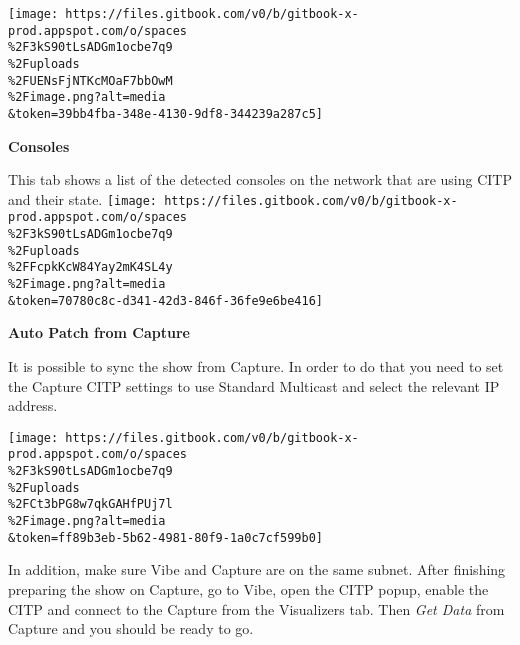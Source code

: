 \documentclass[
]{article}
\begin{document}
\texttt{[image: https://files.gitbook.com/v0/b/gitbook-x-prod.appspot.com/o/spaces\\\%2F3kS90tLsADGm1ocbe7q9\\\%2Fuploads\\\%2FUENsFjNTKcMOaF7bbOwM\\\%2Fimage.png?alt=media\\\&token=39bb4fba-348e-4130-9df8-344239a287c5]}

\textbf{Consoles}

This tab shows a list of the detected consoles on the network that are using CITP and their state.
\texttt{[image: https://files.gitbook.com/v0/b/gitbook-x-prod.appspot.com/o/spaces\\\%2F3kS90tLsADGm1ocbe7q9\\\%2Fuploads\\\%2FFcpkKcW84Yay2mK4SL4y\\\%2Fimage.png?alt=media\\\&token=70780c8c-d341-42d3-846f-36fe9e6be416]}

\textbf{Auto Patch from Capture}

It is possible to sync the show from Capture. In order to do that you need to set the Capture CITP settings to use Standard Multicast and select the relevant IP address.

\texttt{[image: https://files.gitbook.com/v0/b/gitbook-x-prod.appspot.com/o/spaces\\\%2F3kS90tLsADGm1ocbe7q9\\\%2Fuploads\\\%2FCt3bPG8w7qkGAHfPUj7l\\\%2Fimage.png?alt=media\\\&token=ff89b3eb-5b62-4981-80f9-1a0c7cf599b0]}

In addition, make sure Vibe and Capture are on the same subnet. After finishing preparing the show on Capture, go to Vibe, open the CITP popup, enable the CITP and connect to the Capture from the Visualizers tab. Then \emph{Get Data} from Capture and you should be ready to go.
\end{document}

